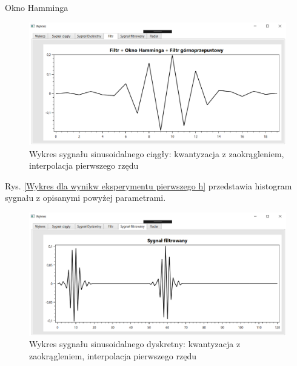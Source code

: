 \documentclass[12pt]{article}
\begin{document}
\newpage
Okno Hamminga
\begin{figure}[h!]
 \centering
 \includegraphics[width=12.3cm]{prostFGOHm.PNG}
 \vspace{-0.3cm}
 \caption{Wykres sygnału sinusoidalnego ciągły: kwantyzacja z zaokrągleniem, interpolacja pierwszego rzędu}
 \label{Wykres dla wyników eksperymentu drugiego}
\end{figure}
\newpage
Rys. \ref{Wykres dla wynikw eksperymentu pierwszego h} przedstawia histogram sygnału z opisanymi powyżej parametrami. 
\begin{figure}[h!]
 \centering
 \includegraphics[width=12.3cm]{prostSFGHm.PNG}
 \vspace{-0.3cm}
 \caption{Wykres sygnału sinusoidalnego dyskretny: kwantyzacja z zaokrągleniem, interpolacja pierwszego rzędu}
 \label{Histogram dla wyników eksperymentu drugiego}
\end{figure}
\end{document}
